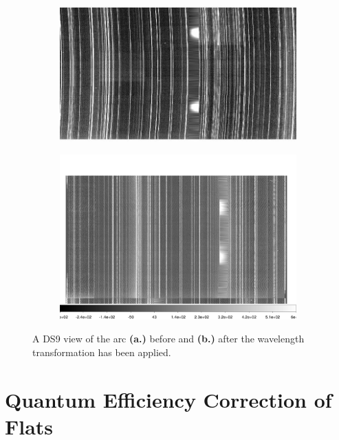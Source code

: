 \documentclass[12pt]{report}
\begin{document}

\begin{figure}[t]
\centering
\begin{subfigure}[t]{0.49\textwidth}
\includegraphics[width=\textwidth]{arc_before.jpeg}
\end{subfigure}
\hfill
\begin{subfigure}[t]{0.49\textwidth}
\includegraphics[width=\textwidth]{ds9}
\end{subfigure}
\caption[Before and After Wavelength Calibration]{A DS9 view of the arc \textbf{(a.)} before and \textbf{(b.)} after the wavelength transformation has been applied.}
\label{fig:wavecal}
\end{figure}

\bigskip
\section{Quantum Efficiency Correction of Flats}
\label{qecorr}
\end{document}
